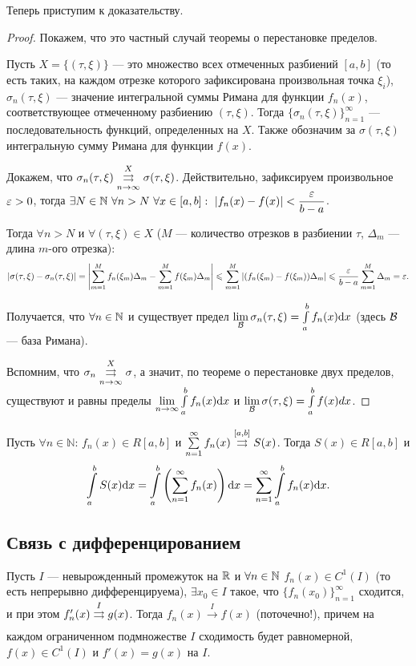 \documentclass[a4paper, 12pt]{article}
\begin{document}
Теперь приступим к доказательству.
\begin{proof}
Покажем, что это частный случай теоремы о перестановке пределов.

Пусть $X = \{(\tau, \xi) \}$ --- это множество всех отмеченных разбиений $[a, b]$ (то есть таких, на каждом отрезке которого зафиксирована произвольная точка $\xi_i$), $\sigma_n(\tau, \xi)$ --- значение интегральной суммы Римана для функции $f_n(x)$, соответствующее отмеченному разбиению $(\tau, \xi)$. Тогда $\{\sigma_n(\tau, \xi) \}_{n=1}^\infty$ --- последовательность функций, определенных на $X$. Также обозначим за $\sigma(\tau, \xi)$ интегральную сумму Римана для функции $f(x)$.

Докажем, что $\sigma_n(\tau, \xi) \overset{X}{\underset{n \to \infty}{\rightrightarrows}} \sigma(\tau, \xi)$. Действительно, зафиксируем произвольное $\varepsilon > 0$, тогда $\exists N \in \N\ \forall n > N\ \forall x \in[a, b]:\ |f_n(x) - f(x)| < \dfrac{\eps}{b-a}$.

Тогда $\forall n > N$ и $\forall (\tau, \xi) \in X$ ($M$ --- количество отрезков в разбиении $\tau$, $\Delta_m$ --- длина $m$-ого отрезка):
\begin{gather}
|\sigma(\tau, \xi) - \sigma_n(\tau, \xi)| = \left| \sum\limits_{m=1}^{M}f_n(\xi_m)\Delta_m - \sum\limits_{m=1}^{M}f(\xi_m)\Delta_m \right| \leqslant \sum\limits_{m=1}^M \left| (f_n(\xi_m) - f(\xi_m))\Delta_m \right| \leqslant \frac{\varepsilon}{b-a}\sum\limits_{m=1}^M \Delta_m = \varepsilon.
\end{gather}

Получается, что $\forall n \in \mathbb{N}$ и существует предел $\lim\limits_{\mathcal{B}} \sigma_n(\tau, \xi) = \int\limits_a^bf_n(x)\mathrm{d}x$ (здесь $\mathcal{B}$ --- база Римана).

Вспомним, что $\sigma_n \overset{X}{\underset{n \to \infty}{\rightrightarrows}} \sigma$, а значит, по теореме о перестановке двух пределов, существуют и равны пределы $\lim\limits_{n \to \infty} \int\limits_a^b f_n(x) \mathrm{d}x$ и $\lim\limits_{\mathcal{B}}\sigma(\tau, \xi) = \int\limits_a^bf(x)dx$.
\end{proof}

\begin{Consequence}
Пусть $\forall n \in \mathbb{N}$: $f_n(x) \in R[a, b]$ и $\sum\limits_{n=1}^{\infty} f_n(x) \overset{[a, b]}{\underset{}{\rightrightarrows}} S(x)$. Тогда $S(x) \in R[a, b]$ и 
$$
\int\limits_a^bS(x) \mathrm{d}x = \int\limits_a^b \left(\sum\limits_{n=1}^{\infty} f_n(x)\right) \mathrm{d}x = \sum\limits_{n=1}^{\infty} \int\limits_a^b f_n(x)\mathrm{d}x.
$$
\end{Consequence}

\subsection{Связь с дифференцированием}
\begin{Statement}
Пусть $I$ --- невырожденный промежуток на $\mathbb{R}$ и $\forall n \in \mathbb{N}$ $f_n(x) \in C^1(I)$ (то есть непрерывно дифференцируема), $\exists x_0 \in I$ такое, что $\{f_n(x_0) \}_{n=1}^\infty$ сходится, и при этом $f'_n(x) \overset{I}{\underset{}{\rightrightarrows}}g(x)$.
Тогда $f_n(x) \overset{I}{\to} f(x)$ (поточечно!), причем на каждом ограниченном подмножестве $I$ сходимость будет равномерной, $f(x) \in C^1(I)$ и $f'(x) = g(x)$ на $I$.
\end{Statement}
\end{document}

